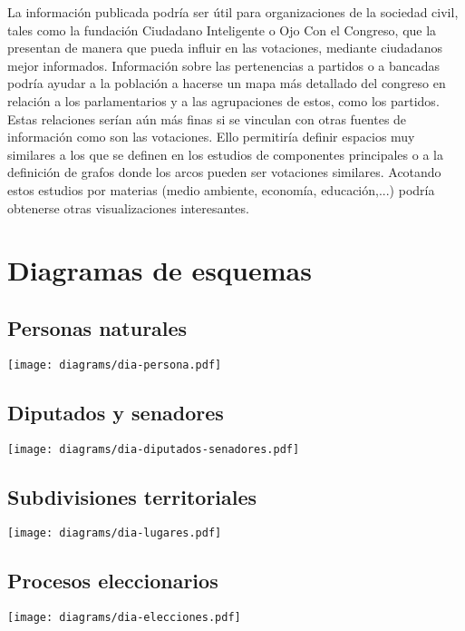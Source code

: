 \documentclass[letterpaper,titlepage]{article}
\begin{document}
La información publicada podría ser útil para organizaciones de la
sociedad civil, tales como la fundación Ciudadano Inteligente o Ojo
Con el Congreso, que la presentan de manera que pueda influir en las
votaciones, mediante ciudadanos mejor informados. Información sobre
las pertenencias a partidos o a bancadas podría ayudar a la población
a hacerse un mapa más detallado del congreso en relación a los
parlamentarios y a las agrupaciones de estos, como los partidos. Estas
relaciones serían aún más finas si se vinculan con otras fuentes de
información como son las votaciones. Ello permitiría definir espacios
muy similares a los que se definen en los estudios de componentes
principales o a la definición de grafos donde los arcos pueden ser
votaciones similares. Acotando estos estudios por materias (medio
ambiente, economía, educación,...) podría obtenerse otras
visualizaciones interesantes.

\newpage
\appendix

\section{Diagramas de esquemas}
\label{diagramas}

\subsection{Personas naturales}
\begin{center}
  \texttt{[image: diagrams/dia-persona.pdf]}
\end{center}

\subsection{Diputados y senadores}
\begin{center}
  \texttt{[image: diagrams/dia-diputados-senadores.pdf]}
\end{center}

\subsection{Subdivisiones territoriales}
\begin{center}
  \texttt{[image: diagrams/dia-lugares.pdf]}
\end{center}

\subsection{Procesos eleccionarios}
\begin{center}
  \texttt{[image: diagrams/dia-elecciones.pdf]}
\end{center}
\end{document}
